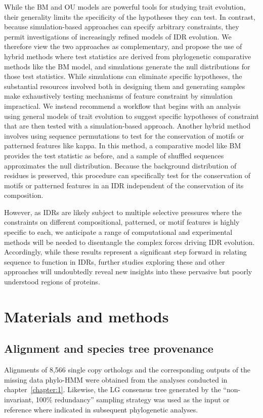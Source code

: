 While the BM and OU models are powerful tools for studying trait evolution, their generality limits the specificity of the hypotheses they can test. In contrast, because simulation-based approaches can specify arbitrary constraints, they permit investigations of increasingly refined models of IDR evolution. We therefore view the two approaches as complementary, and propose the use of hybrid methods where test statistics are derived from phylogenetic comparative methods like the BM model, and simulations generate the null distributions for those test statistics. While simulations can eliminate specific hypotheses, the substantial resources involved both in designing them and generating samples make exhaustively testing mechanisms of feature constraint by simulation impractical. We instead recommend a workflow that begins with an analysis using general models of trait evolution to suggest specific hypotheses of constraint that are then tested with a simulation-based approach. Another hybrid method involves using sequence permutations to test for the conservation of motifs or patterned features like kappa. In this method, a comparative model like BM provides the test statistic as before, and a sample of shuffled sequences approximates the null distribution. Because the background distribution of residues is preserved, this procedure can specifically test for the conservation of motifs or patterned features in an IDR independent of the conservation of its composition.

However, as IDRs are likely subject to multiple selective pressures where the constraints on different compositional, patterned, or motif features is highly specific to each, we anticipate a range of computational and experimental methods will be needed to disentangle the complex forces driving IDR evolution. Accordingly, while these results represent a significant step forward in relating sequence to function in IDRs, further studies exploring these and other approaches will undoubtedly reveal new insights into these pervasive but poorly understood regions of proteins.

\section{Materials and methods}
\subsection{Alignment and species tree provenance}
Alignments of 8,566 single copy orthologs and the corresponding outputs of the missing data phylo-HMM were obtained from the analyses conducted in chapter~\ref{chapter:1}. Likewise, the LG consensus tree generated by the ``non-invariant, 100\% redundancy'' sampling strategy was used as the input or reference where indicated in subsequent phylogenetic analyses.

